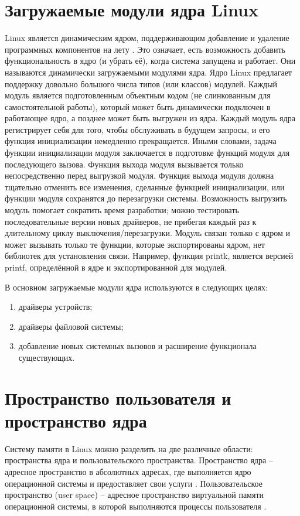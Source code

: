 \section{Загружаемые модули ядра Linux}
	Linux является динамическим ядром, 
	поддерживающим добавление и удаление программных компонентов на лету \cite{anatomy-linux-kernel}.
	Это означает, есть возможность добавить функциональность в ядро (и убрать её), когда система запущена и работает.
	Они называются динамически загружаемыми модулями ядра.
	Ядро Linux предлагает поддержку довольно большого числа типов (или классов) модулей.
	Каждый модуль является подготовленным объектным кодом (не слинкованным для самостоятельной работы),
	который может быть динамически подключен в работающее ядро, а позднее может быть выгружен из ядра.
	Каждый модуль ядра регистрирует себя для того, чтобы обслуживать в будущем запросы,
	и его функция инициализации немедленно прекращается. 
	Иными словами, задача функции инициализации модуля заключается в подготовке функций модуля для последующего вызова.
	Функция выхода модуля вызывается только непосредственно перед выгрузкой модуля. 
	Функция выхода модуля должна тщательно отменить все изменения, сделанные функцией инициализации, 
	или функции модуля сохранятся до перезагрузки системы. 
	Возможность выгрузить модуль помогает сократить время разработки; 
	можно тестировать последовательные версии новых драйверов, 
	не прибегая каждый раз к длительному циклу выключения/перезагрузки. 
	Модуль связан только с ядром и может вызывать только те функции, 
	которые экспортированы ядром, нет библиотек для установления связи. 
	Например, функция printk, является версией printf, 
	определённой в ядре и экспортированной для модулей.
	
	В основном загружаемые модули ядра используются в следующих целях:
	\begin{enumerate}
		\item драйверы устройств;
		\item драйверы файловой системы;
		\item добавление новых системных вызовов и расширение функционала существующих.
	\end{enumerate}

\section{Пространство пользователя и пространство ядра}
	Систему памяти в Linux можно разделить на две различные области: пространства ядра и пользовательского пространства.
	Пространство ядра -- адресное пространство в абсолютных адресах,
	где выполняется ядро операционной системы и предоставляет свои услуги \cite{linux-kernel-space}.
	Пользовательское пространство (user space) -- адресное пространство виртуальной памяти операционной системы,
	в которой выполняются процессы пользователя \cite{linux-user-space}.
	
